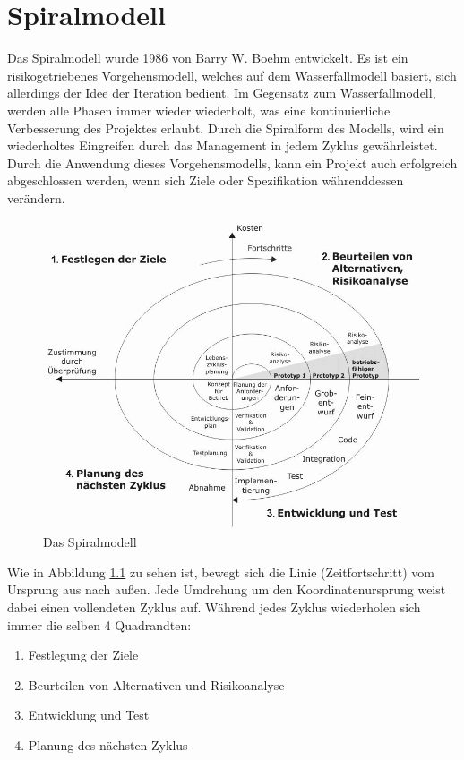 \documentclass[a4paper, twopage]{scrreprt}
\begin{document}
\chapter{Spiralmodell}
\label{ch:spiralmodell}
Das Spiralmodell wurde 1986 von Barry W. Boehm entwickelt. Es ist ein risikogetriebenes Vorgehensmodell, welches auf dem Wasserfallmodell basiert, sich allerdings der Idee der Iteration bedient. Im Gegensatz zum Wasserfallmodell, werden alle Phasen immer wieder wiederholt, was eine kontinuierliche Verbesserung des Projektes erlaubt. Durch die Spiralform des Modells, wird ein wiederholtes Eingreifen durch das Management in jedem Zyklus gewährleistet.
Durch die Anwendung dieses Vorgehensmodells, kann ein Projekt auch erfolgreich abgeschlossen werden, wenn sich Ziele oder Spezifikation währenddessen verändern. \par
\begin{figure}[h]
\centering
	\includegraphics[scale=0.6]{Images/spiralmodell}
	\caption[Das Spiralmodell]{Das Spiralmodell\cite{wikipedia:spiralmodell}}
	\label{fig:spiralmodell}
\end{figure}
Wie in Abbildung \ref{fig:spiralmodell} zu sehen ist, bewegt sich die Linie (Zeitfortschritt) vom Ursprung aus nach außen. Jede Umdrehung um den Koordinatenursprung weist dabei einen vollendeten Zyklus auf.
Während jedes Zyklus wiederholen sich immer die selben 4 Quadrandten:
\begin{enumerate}
	\item Festlegung der Ziele
	\item Beurteilen von Alternativen und Risikoanalyse
	\item Entwicklung und Test
	\item Planung des nächsten Zyklus
\end{enumerate}
\end{document}
